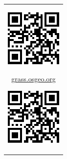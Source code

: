 \documentclass[25pt, margin=0mm, innermargin=15mm, blockverticalspace=15mm, colspace=15mm, subcolspace=8mm]{tikzposter}
\begin{document}
\begin{columns}
{\begin{center}
\begin{tabular}{c}


\begin{minipage}{\qrcodesize}
\includegraphics[width=\textwidth]{./images/grass_qr.pdf}
\end{minipage}

\begin{minipage}{0.15\linewidth}
\small {\url{grass.osgeo.org}}
\end{minipage}

\begin{minipage}{\qrcodesize}
\includegraphics[width=\textwidth]{./images/grass_qr.pdf}
\end{minipage}


\end{tabular}
\end{center}}
\end{columns}
\end{document}
